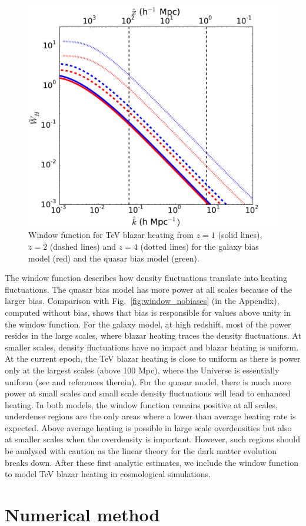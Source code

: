 \documentclass[twocolumns]{emulateapj}
\begin{document}
\begin{figure}[h]
  \centering
  \includegraphics[width = .45\textwidth ]{window_gal_qso}
  \caption{Window function for TeV blazar heating from $z=1$ (solid lines), $z=2$ (dashed lines) and $z=4$ (dotted lines) for the galaxy bias model (red) and the quasar bias model (green).}
  \label{fig:window}
\end{figure}

The window function describes how density fluctuations translate into heating fluctuations. The quasar  bias model has more power at all scales because of the larger bias. Comparison with Fig.~\ref{fig:window_nobiases} (in the Appendix), computed without bias, shows that bias is responsible for values above unity in the window function. For the galaxy model, at high redshift, most of the power resides in the large scales, where blazar heating traces the density fluctuations. At smaller scales, density fluctuations have no impact and blazar heating is uniform. At the current epoch,  the TeV blazar heating is close to uniform as there is power only at the largest scales (above 100 Mpc), where the Universe is essentially uniform  (see \citet{2013MNRAS.429.2910C} and references therein). For the quasar model, there is much more power at small scales and small scale density fluctuations will lead to enhanced heating. In both models, the window function remains positive at all scales, underdense regions are the only areas where a lower than average heating rate is expected. Above average  heating is possible in large scale overdensities but also at  smaller scales when the overdensity is important.  However, such regions should be analysed with caution as the linear theory for the dark matter evolution breaks down. After these first analytic estimates, we include the window function to model TeV blazar heating in cosmological simulations. 


\section{Numerical method}
\end{document}
